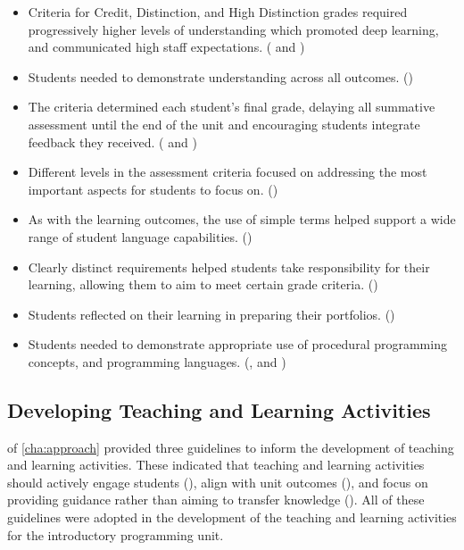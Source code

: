 \begin{itemize}[noitemsep,nolistsep]
	\item Criteria for Credit, Distinction, and High Distinction grades required progressively higher levels of understanding which promoted deep learning, and communicated high staff expectations. ( and )
	\item Students needed to demonstrate understanding across all outcomes. ()
	\item The criteria determined each student's final grade, delaying all summative assessment until the end of the unit and encouraging students integrate feedback they received. ( and )
	\item Different levels in the assessment criteria focused on addressing the most important aspects for students to focus on. ()
	\item As with the learning outcomes, the use of simple terms helped support a wide range of student language capabilities. ()
	\item Clearly distinct requirements helped students take responsibility for their learning, allowing them to aim to meet certain grade criteria. ()
	\item Students reflected on their learning in preparing their portfolios. ()
	\item Students needed to demonstrate appropriate use of procedural programming concepts, and programming languages. (,  and )
\end{itemize}


\subsection{Developing Teaching and Learning Activities} %
\label{sub:intro_developing_teaching_and_learning_activities}

 of \cref{cha:approach} provided three guidelines to inform the development of teaching and learning activities. These indicated that teaching and learning activities should actively engage students (), align with unit outcomes (), and focus on providing guidance rather than aiming to transfer knowledge (). All of these guidelines were adopted in the development of the teaching and learning activities for the introductory programming unit.

